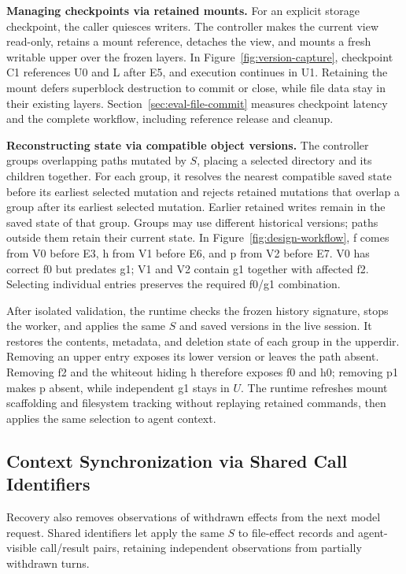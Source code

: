 \textbf{Managing checkpoints via retained mounts.}
For an explicit storage checkpoint, the caller quiesces writers. The
controller makes the current view read-only, retains a mount reference,
detaches the view, and mounts a fresh writable upper over the frozen layers.
In Figure~\ref{fig:version-capture}, checkpoint C1 references U0 and L
after E5, and execution continues in U1. Retaining the mount defers
superblock destruction to commit or close, while file data stay in their
existing layers. Section~\ref{sec:eval-file-commit} measures checkpoint
latency and the complete workflow, including reference release and cleanup.

\textbf{Reconstructing state via compatible object versions.}
The controller groups overlapping paths mutated by $S$, placing a selected
directory and its children together. For each group, it resolves the
nearest compatible saved state before its earliest selected mutation and
rejects retained mutations that overlap a group after its earliest selected
mutation. Earlier retained writes remain in the saved state of that group.
Groups may use different
historical versions; paths outside them retain their current state.
In Figure~\ref{fig:design-workflow}, f comes from V0 before E3, h from V1
before E6, and p from V2 before E7. V0 has correct f0 but predates g1;
V1 and V2 contain g1 together with affected f2. Selecting individual
entries preserves the required f0/g1 combination.

After isolated validation, the runtime checks the frozen history signature,
stops the worker, and applies the same $S$ and saved versions in the live
session. It restores the contents, metadata,
and deletion state of each group in the upperdir. Removing an upper entry
exposes its lower version or leaves the path absent. Removing f2 and the
whiteout hiding h therefore exposes f0 and h0; removing p1 makes p absent,
while independent g1 stays in $U$. The runtime refreshes mount scaffolding
and filesystem tracking without replaying retained commands, then applies
the same selection to agent context.

\subsection{Context Synchronization via Shared Call Identifiers}
\label{sec:context-reconstruction}
Recovery also removes observations of withdrawn effects
from the next model request. Shared identifiers let \system apply the same
$S$ to file-effect records and agent-visible call/result pairs, retaining
independent observations from partially withdrawn turns.

